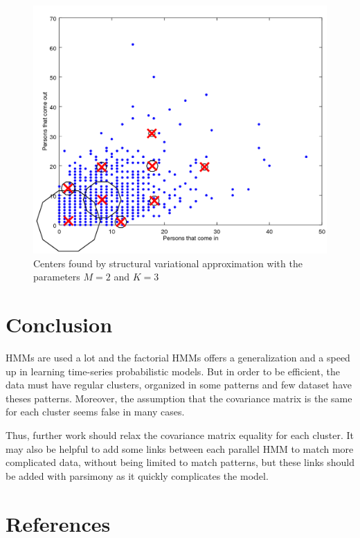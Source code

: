 \documentclass{article}
\begin{document}
\begin{figure}[h]
\begin{minipage}[b]{0.49\linewidth}
		\includegraphics[width=1.0\textwidth]{expe4.png}
		\begin{center}
			\caption{Centers found by structural variational approximation with the parameters $M = 2$ and $K = 3$}
		\end{center}\medskip
	\end{minipage}
	\label{fig:f}
\end{figure}

\section{Conclusion}

HMMs are used a lot and the factorial HMMs offers a generalization and a speed up in learning time-series probabilistic models. But in order to be efficient, the data must have regular clusters, organized in some patterns and few dataset have theses patterns. Moreover, the assumption that the covariance matrix is the same for each cluster seems false in many cases.
\newline

Thus, further work should relax the covariance matrix equality for each cluster. It may also be helpful to add some links between each parallel HMM to match more complicated data, without being limited to match patterns, but these links should be added with parsimony as it quickly complicates the model.


\section*{References}
\end{document}
